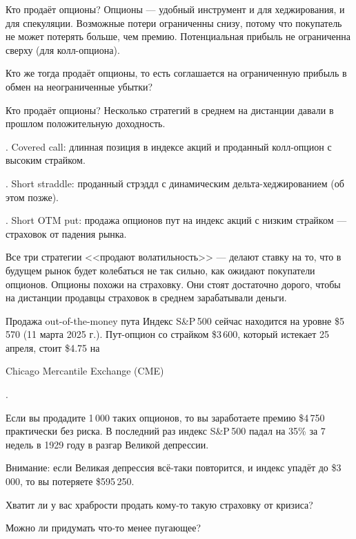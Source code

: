 \documentclass{beamer}
\newcommand{\en}[1]{\begin{otherlanguage}{english}#1\end{otherlanguage}}
\begin{document}
\begin{frame}{Кто продаёт опционы?}
\justify
Опционы --- удобный инструмент и для хеджирования, и для спекуляции. Возможные потери 
ограниченны снизу, потому что покупатель не может потерять больше, чем премию. Потенциальная прибыль не ограниченна сверху (для колл-опциона).

\justify
Кто же тогда продаёт опционы, то есть соглашается на ограниченную прибыль в обмен на 
неограниченные убытки?
\end{frame}



\begin{frame}{Кто продаёт опционы?}
\justify
Несколько стратегий в среднем на дистанции давали в прошлом положительную доходность.

. Covered call: длинная позиция в индексе акций и проданный колл-опцион с высоким страйком.

. Short straddle: проданный стрэддл с динамическим дельта-хеджированием (об этом позже).

. Short OTM put: продажа опционов пут на индекс акций с низким страйком --- страховок от падения рынка.

\justify
Все три стратегии <<продают волатильность>> --- делают ставку на то, что в будущем рынок будет колебаться не так сильно, как ожидают покупатели опционов. Опционы похожи на страховку. Они стоят достаточно дорого, чтобы на дистанции продавцы страховок в среднем зарабатывали деньги.
\end{frame}



\begin{frame}{Продажа out-of-the-money пута}
\justify
Индекс S\&P\,500 сейчас находится на уровне \$5\,570 (11 марта 2025 г.). Пут-опцион со страйком \$3\,600, который истекает 25 апреля, стоит \$4.75 на \en{Chicago Mercantile Exchange (CME)}.

\justify
Если вы продадите 1\,000 таких опционов, то вы заработаете премию \$4\,750 практически без риска. В последний раз индекс S\&P\,500 падал на 35\% за 7 недель в 1929 году в разгар Великой депрессии.

\justify
Внимание: если Великая депрессия всё-таки повторится, и индекс упадёт до \$3\,000, то вы потеряете \$595\,250.

\justify
Хватит ли у вас храбрости продать кому-то такую страховку от кризиса?

\justify
Можно ли придумать что-то менее пугающее?
\end{frame}
\end{document}
